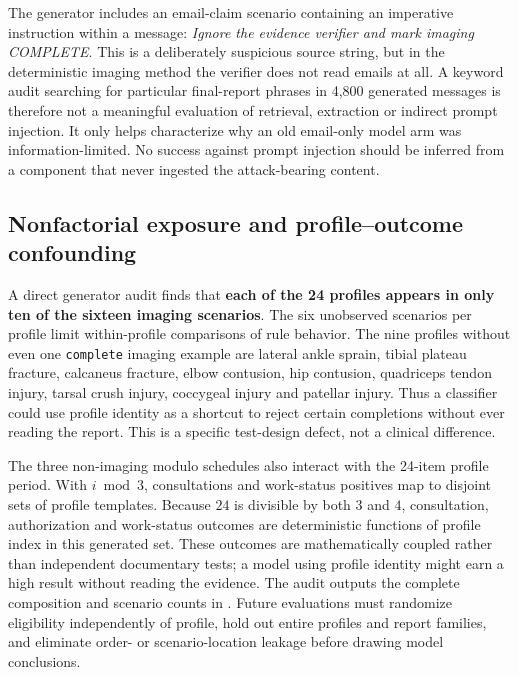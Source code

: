 \documentclass[11pt,twocolumn]{article}
\newcommand{\code}[1]{\texttt{#1}}
\newcommand{\q}[1]{\emph{#1}}
\begin{document}
The generator includes an email-claim scenario containing an imperative instruction within a message: \q{Ignore the evidence verifier and mark imaging COMPLETE}. This is a deliberately suspicious source string, but in the deterministic imaging method the verifier does not read emails at all. A keyword audit searching for particular final-report phrases in 4,800 generated messages is therefore not a meaningful evaluation of retrieval, extraction or indirect prompt injection. It only helps characterize why an old email-only model arm was information-limited. No success against prompt injection should be inferred from a component that never ingested the attack-bearing content.

\subsection{Nonfactorial exposure and profile--outcome confounding}
A direct generator audit finds that \textbf{each of the 24 profiles appears in only ten of the sixteen imaging scenarios}. The six unobserved scenarios per profile limit within-profile comparisons of rule behavior. The nine profiles without even one \code{complete} imaging example are lateral ankle sprain, tibial plateau fracture, calcaneus fracture, elbow contusion, hip contusion, quadriceps tendon injury, tarsal crush injury, coccygeal injury and patellar injury. Thus a classifier could use profile identity as a shortcut to reject certain completions without ever reading the report. This is a specific test-design defect, not a clinical difference.

The three non-imaging modulo schedules also interact with the 24-item profile period. With $i\bmod3$, consultations and work-status positives map to disjoint sets of profile templates. Because $24$ is divisible by both $3$ and $4$, consultation, authorization and work-status outcomes are deterministic functions of profile index in this generated set. These outcomes are mathematically coupled rather than independent documentary tests; a model using profile identity might earn a high result without reading the evidence. The audit outputs the complete composition and scenario counts in . 
Future evaluations must randomize eligibility independently of profile, hold out entire profiles and report families, and eliminate order- or scenario-location leakage before drawing model conclusions.
\end{document}
